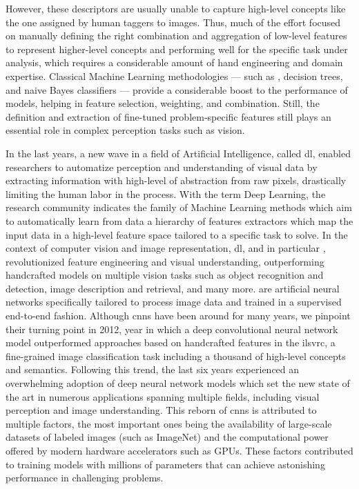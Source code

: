 However, these descriptors are usually unable to capture high-level concepts like the one assigned by human taggers to images.
Thus, much of the effort focused on manually defining the right combination and aggregation of low-level features to represent higher-level concepts and performing well for the specific task under analysis, which requires a considerable amount of hand engineering and domain expertise.
Classical Machine Learning methodologies --- such as , decision trees, and naive Bayes classifiers --- provide a considerable boost to the performance of models, helping in feature selection, weighting, and combination.
Still, the definition and extraction of fine-tuned problem-specific features still plays an essential role in complex perception tasks such as vision.

In the last years, a new wave in a field of Artificial Intelligence, called \gls{dl}, enabled researchers to automatize perception and understanding of visual data by extracting information with high-level of abstraction from raw pixels, drastically limiting the human labor in the process.
With the term Deep Learning, the research community indicates the family of Machine Learning methods which aim to automatically learn from data a hierarchy of features extractors which map the input data in a high-level feature space tailored to a specific task to solve.
In the context of computer vision and image representation, \acrlong{dl}, and in particular , revolutionized feature engineering and visual understanding, outperforming handcrafted models on multiple vision tasks such as object recognition and detection, image description and retrieval,  and many more.
 are artificial neural networks specifically tailored to process image data and trained in a supervised end-to-end fashion.
Although \glspl{cnn} have been around for many years, we pinpoint their turning point in 2012, year in which a deep convolutional neural network model outperformed approaches based on handcrafted features in the \acrlong{ilsvrc}, a fine-grained image classification task including a thousand of high-level concepts and semantics.
Following this trend, the last six years experienced an overwhelming adoption of deep neural network models which set the new state of the art in numerous applications spanning multiple fields, including visual perception and image understanding.
This reborn of \glspl{cnn} is attributed to multiple factors, the most important ones being the availability of large-scale datasets of labeled images (such as ImageNet) and the computational power offered by modern hardware accelerators such as GPUs.
These factors contributed to training models with millions of parameters that can achieve astonishing performance in challenging problems.

